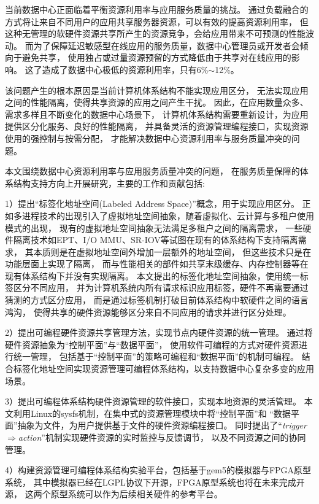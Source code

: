 \begin{cabstract}
  当前数据中心正面临着平衡资源利用率与应用服务质量的挑战。
  通过负载融合的方式将让来自不同用户的应用共享服务器资源，可以有效的提高资源利用率，
  但这种无管理的软硬件资源共享所产生的资源竞争，会给应用带来不可预测的性能波动。
  而为了保障延迟敏感型在线应用的服务质量，数据中心管理员或开发者会倾向于避免共享，
  使用独占或过量资源预留的方式降低由于共享对在线应用的影响。
  这了造成了数据中心极低的资源利用率，只有6\%$\sim$12\%。

  该问题产生的根本原因是当前计算机体系结构不能实现应用区分，
  无法实现应用之间的性能隔离，使得共享资源的应用之间产生干扰。
  因此，在应用数量众多、需求多样且不断变化的数据中心场景下，
  计算机体系结构需要重新设计，为应用提供区分化服务、良好的性能隔离，
  并具备灵活的资源管理编程接口，实现资源使用的强控制与按需分配，
  才能解决数据中心资源利用率与服务质量冲突的问题。

  本文围绕数据中心资源利用率与应用服务质量冲突的问题，
  在服务质量保障的体系结构支持方向上开展研究，主要的工作和贡献包括:

  1）提出``标签化地址空间(Labeled Address Space)''概念，用于实现应用区分。
     正如多进程技术的出现引入了虚拟地址空间抽象，随着虚拟化、云计算与多租户使用模式的出现，
     现有的虚拟地址空间抽象无法满足多租户之间的隔离需求，
     一些硬件隔离技术如EPT、I/O MMU、SR-IOV等试图在现有的体系结构下支持隔离需求，
     其本质则是在虚拟地址空间外增加一层额外的地址空间，
     但这些技术只是在功能层面上实现了隔离，
     而与性能相关的部件如共享末级缓存、内存控制器等在现有体系结构下并没有实现隔离。
     本文提出的标签化地址空间抽象，使用统一标签区分不同应用，
     并为计算机系统内所有请求标识应用标签，硬件不再需要通过猜测的方式区分应用，
     而是通过标签机制打破目前体系结构中软硬件之间的语言鸿沟，
     使得共享的硬件资源能够区分来自不同应用的请求并进行区分处理。

  2）提出可编程硬件资源共享管理方法，实现节点内硬件资源的统一管理。
     通过将硬件资源抽象为``控制平面''与``数据平面''，
     使用软件可编程的方式对硬件资源进行统一管理，
     包括基于``控制平面''的策略可编程和``数据平面''的机制可编程。
     结合标签化地址空间实现资源管理可编程体系结构，以支持数据中心复杂多变的应用场景。

  3）提出可编程体系结构硬件资源管理的软件接口，实现本地资源的灵活管理。
     本文利用Linux的sysfs机制，在集中式的资源管理模块中将``控制平面''和
     ``数据平面''抽象为文件，为用户提供基于文件的硬件资源编程接口。
     同时提出了``\emph{trigger$\Rightarrow$action}''机制实现硬件资源的实时监控与反馈调节，
     以及不同资源之间的协同管理。

  4）构建资源管理可编程体系结构实验平台，包括基于gem5的模拟器与FPGA原型系统，
     其中模拟器已经在LGPL协议下开源，FPGA原型系统也将在未来完成开源，
     这两个原型系统可以作为后续相关硬件的参考平台。
\end{cabstract}

